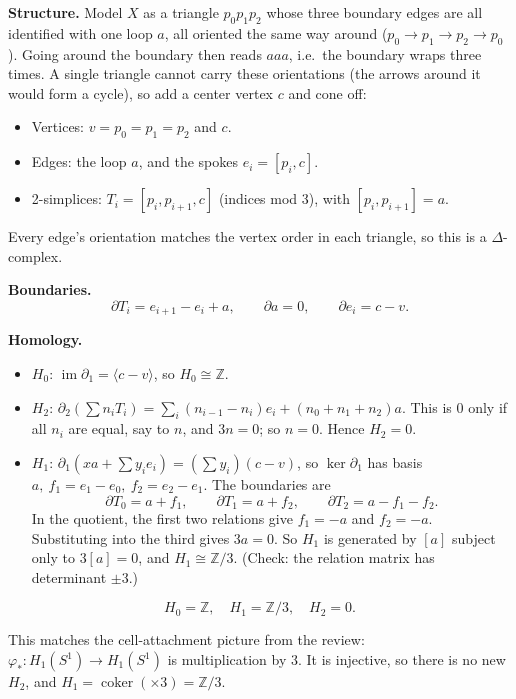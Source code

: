 \documentclass[11pt]{article}
\newcommand{\Z}{\mathbb Z}
\newcommand{\im}{\operatorname{im}}
\newcommand{\coker}{\operatorname{coker}}
\begin{document}
\textbf{Structure.} Model $X$ as a triangle $p_0p_1p_2$ whose three boundary edges are all identified with one loop $a$, all oriented the same way around ($p_0\to p_1\to p_2\to p_0$). Going around the boundary then reads $aaa$, i.e.\ the boundary wraps three times. A single triangle cannot carry these orientations (the arrows around it would form a cycle), so add a center vertex $c$ and cone off:
\begin{center}
\end{center}
\begin{itemize}
\item Vertices: $v=p_0=p_1=p_2$ and $c$.
\item Edges: the loop $a$, and the spokes $e_i=[p_i,c]$.
\item 2-simplices: $T_i=[p_i,p_{i+1},c]$ (indices mod 3), with $[p_i,p_{i+1}]=a$.
\end{itemize}
Every edge's orientation matches the vertex order in each triangle, so this is a $\Delta$-complex.

\textbf{Boundaries.}
\[\partial T_i=e_{i+1}-e_i+a,\qquad\partial a=0,\qquad\partial e_i=c-v.\]

\textbf{Homology.}
\begin{itemize}
\item $H_0$: $\im\partial_1=\langle c-v\rangle$, so $H_0\cong\Z$.
\item $H_2$: $\partial_2(\sum n_iT_i)=\sum_i(n_{i-1}-n_i)e_i+(n_0+n_1+n_2)a$. This is $0$ only if all $n_i$ are equal, say to $n$, and $3n=0$; so $n=0$. Hence $H_2=0$.
\item $H_1$: $\partial_1(xa+\sum y_ie_i)=(\sum y_i)(c-v)$, so $\ker\partial_1$ has basis $a,\ f_1=e_1-e_0,\ f_2=e_2-e_1$. The boundaries are
\[\partial T_0=a+f_1,\qquad\partial T_1=a+f_2,\qquad\partial T_2=a-f_1-f_2.\]
In the quotient, the first two relations give $f_1=-a$ and $f_2=-a$. Substituting into the third gives $3a=0$. So $H_1$ is generated by $[a]$ subject only to $3[a]=0$, and $H_1\cong\Z/3$. (Check: the relation matrix has determinant $\pm3$.)
\end{itemize}
\[\boxed{H_0=\Z,\quad H_1=\Z/3,\quad H_2=0.}\]
\begin{note}
This matches the cell-attachment picture from the review: $\varphi_*:H_1(S^1)\to H_1(S^1)$ is multiplication by $3$. It is injective, so there is no new $H_2$, and $H_1=\coker(\times3)=\Z/3$.
\end{note}
\end{document}
